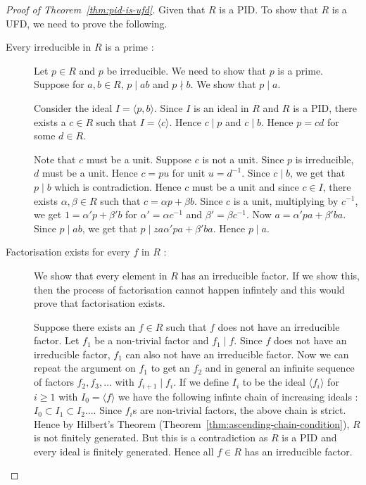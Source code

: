 \begin{proof}[Proof of Theorem~\ref{thm:pid-is-ufd}]
	Given that $R$ is a PID. To show that $R$ is a UFD, we need to prove
	the following.  
	\begin{description}
	\item[Every irreducible in $R$ is a prime : ] 
	Let $p \in R$ and $p$ be irreducible. We need to show that $p$ is a
	prime. Suppose for $a,b \in R$, $p \mid ab$ and $p \nmid b$. We show
	that $p \mid a$. 

	Consider the ideal $I = \langle p, b \rangle$. Since $I$ is an ideal
	in $R$ and $R$ is a PID, there exists a $c \in R$ such that $I =
	\langle c \rangle$. Hence $c \mid p$ and $c \mid b$. Hence $p = cd$ for
	some $d \in R$. 

	Note that $c$ must be a unit. Suppose $c$ is not a unit. Since $p$ is
	irreducible, $d$ must be a unit. Hence $c = pu$ for unit $u = d^{-1}$.
	Since $c \mid b$, we get that $p \mid b$ which is contradiction. Hence
	$c$ must be a unit and since $c \in I$, there exists $\alpha, \beta
	\in R$ such that $c = \alpha p + \beta b$. Since $c$ is a unit,
	multiplying by $c^{-1}$, we get $1 =  \alpha'p+\beta' b$ for 
	$\alpha' = \alpha c^{-1}$ and $\beta' = \beta c^{-1}$. Now $a = \alpha'
	pa + \beta' ba$. Since $p \mid ab$, we get that $p  \mid
za	\alpha' pa+\beta' ba$. Hence $p \mid a$.
	\item [Factorisation exists for every $f$ in $R$ : ] We show that
	every element in $R$ has an irreducible factor. If we show
		this, then the process of
	factorisation cannot happen infintely and this would prove that
	factorisation exists.
		
	Suppose there exists an $f \in R$ such that $f$ does not have an
	irreducible factor. Let $f_1$ be a non-trivial factor and $f_1 \mid
	f$. Since $f$ does not have an irreducible factor, $f_1$ can also not
	have an irreducible factor. Now we can repeat the argument on $f_1$ to
	get an $f_2$ and in general an infinite sequence of factors
	$f_2,f_3,\ldots$ with $f_{i+1} \mid f_i$. If we define $I_i$ to be the
	ideal $\langle f_i \rangle $ for $i \ge 1$ with $I_0 = \langle f
	\rangle$ we have the following infinte chain of increasing ideals :
	$I_0 \subset I_1 \subset I_2 \ldots$. Since $f_i$s are non-trivial
	factors, the above chain is strict. Hence by Hilbert's Theorem
	(Theorem~\ref{thm:ascending-chain-condition}), $R$ is not finitely
	generated. But this is a contradiction as $R$ is a PID and every ideal
	is finitely generated. Hence all $f \in R$ has an irreducible factor.
\end{description}
\end{proof}

